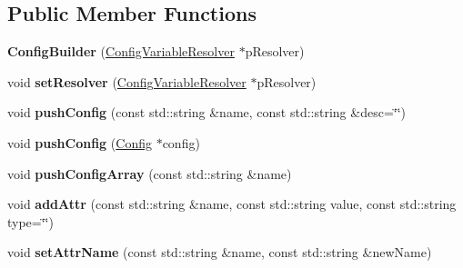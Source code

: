 \subsection*{Public Member Functions}
\begin{DoxyCompactItemize}
\item 
\hypertarget{classtheoria_1_1config_1_1ConfigBuilder_adf10af8634fe6ce1af5627e2c1ae8baa}{{\bfseries Config\+Builder} (\hyperlink{classtheoria_1_1config_1_1ConfigVariableResolver}{Config\+Variable\+Resolver} $\ast$p\+Resolver)}\label{classtheoria_1_1config_1_1ConfigBuilder_adf10af8634fe6ce1af5627e2c1ae8baa}

\item 
\hypertarget{classtheoria_1_1config_1_1ConfigBuilder_aff25e4ada86baf419820b610a4707cbe}{void {\bfseries set\+Resolver} (\hyperlink{classtheoria_1_1config_1_1ConfigVariableResolver}{Config\+Variable\+Resolver} $\ast$p\+Resolver)}\label{classtheoria_1_1config_1_1ConfigBuilder_aff25e4ada86baf419820b610a4707cbe}

\item 
\hypertarget{classtheoria_1_1config_1_1ConfigBuilder_ad7542393581c33259aae6d07d11391dd}{void {\bfseries push\+Config} (const std\+::string \&name, const std\+::string \&desc=\char`\"{}\char`\"{})}\label{classtheoria_1_1config_1_1ConfigBuilder_ad7542393581c33259aae6d07d11391dd}

\item 
\hypertarget{classtheoria_1_1config_1_1ConfigBuilder_a2dc70e43627e67521bf921152ee3c131}{void {\bfseries push\+Config} (\hyperlink{classtheoria_1_1config_1_1Config}{Config} $\ast$config)}\label{classtheoria_1_1config_1_1ConfigBuilder_a2dc70e43627e67521bf921152ee3c131}

\item 
\hypertarget{classtheoria_1_1config_1_1ConfigBuilder_a38baf2a30a0be4a5e99969c07223bc9b}{void {\bfseries push\+Config\+Array} (const std\+::string \&name)}\label{classtheoria_1_1config_1_1ConfigBuilder_a38baf2a30a0be4a5e99969c07223bc9b}

\item 
\hypertarget{classtheoria_1_1config_1_1ConfigBuilder_ac58bdaa4a914c8ad0c4901128e2e7b6b}{void {\bfseries add\+Attr} (const std\+::string \&name, const std\+::string value, const std\+::string type=\char`\"{}\char`\"{})}\label{classtheoria_1_1config_1_1ConfigBuilder_ac58bdaa4a914c8ad0c4901128e2e7b6b}

\item 
\hypertarget{classtheoria_1_1config_1_1ConfigBuilder_a267121aec4f3c65ff88eb36d691ce509}{void {\bfseries set\+Attr\+Name} (const std\+::string \&name, const std\+::string \&new\+Name)}\label{classtheoria_1_1config_1_1ConfigBuilder_a267121aec4f3c65ff88eb36d691ce509}


\end{DoxyCompactItemize}
